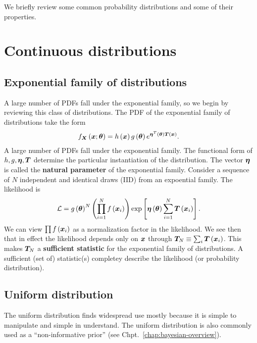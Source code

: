 We briefly review some common probability distributions and some of their properties.

\section{Continuous distributions}
\subsection{Exponential family of distributions}

A large number of PDFs fall under the exponential family, so we begin by reviewing this class of distributions. 
The PDF of the exponential family of distributions take the form
\begin{align}
    f_{{\bm X}}\left({\bm x};{\bm \theta}\right)
    =
    h\left({\bm x}\right)
    g\left({\bm \theta}\right)
    e^{{\bm \eta}^T\left({\bm \theta}\right){\bm T}\left({\bm x}\right)}
    .
\end{align}
A large number of PDFs fall under the exponential family. 
The functional form of $h,g,{\bm \eta},{\bm T}$ determine the particular instantiation of the distribution.
The vector ${\bm \eta}$ is called the \textbf{natural parameter} of the exponential family.
Consider a sequence of $N$ independent and identical draws (IID) from an expoential family.
The likelihood is
\begin{align}
    \mathcal{L}
    =
    g\left({\bm \theta}\right)^N
    \left(\prod_{i=1}^N f\left({\bm x}_i\right)\right)
    \mathrm{exp}\left[
        {\bm \eta}\left({\bm \theta}\right)
        \sum_{i=1}^N {\bm T}\left({\bm x}_i\right)
    \right]
    .
\end{align}
We can view $\prod f\left({\bm x}_i\right)$ as a normalization factor in the likelihood.
We see then that in effect the likelihood depends only on ${\bm x}$ through ${\bm T}_N \equiv \sum_i {\bm T}\left({\bm x}_i\right)$.
This makes ${\bm T}_N$ a \textbf{sufficient statistic} for the exponential family of distributions.
A sufficient (set of) statistic(s) completey describe the likelihood (or probability distribution).
\subsection{Uniform distribution}
The uniform distribution finds widespread use mostly because it is simple to manipulate and simple in understand.
The uniform distribution is also commonly used as a ``non-informative prior'' (see Chpt.~\ref{chap:bayesian-overview}). 

